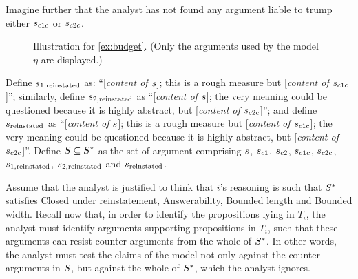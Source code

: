 \documentclass[version=3.21, pagesize, twoside=off, bibliography=totoc, DIV=calc, fontsize=12pt, a4paper]{scrartcl}
\begin{document}
\begin{example}
Imagine further that the analyst has not found any argument liable to trump either $s_{c1c}$ or $s_{c2c}$.

\begin{figure}
	\centering
	\caption{Illustration for \cref{ex:budget}. (Only the arguments used by the model $\eta$ are displayed.)}
	\label{fig:budget}
\end{figure}

Define $s_{1, \text{reinstated}}$ as: “[\emph{content of $s$}]; this is a rough measure but [\emph{content of $s_{c1c}$}]”; similarly, define $s_{2, \text{reinstated}}$ as “[\emph{content of $s$}]; the very meaning could be questioned because it is highly abstract, but [\emph{content of $s_{c2c}$}]”; and define $s_\text{reinstated}$ as “[\emph{content of $s$}]; this is a rough measure but [\emph{content of $s_{c1c}$}]; the very meaning could be questioned because it is highly abstract, but [\emph{content of $s_{c2c}$}]”. Define $S \subseteq S^*$ as the set of argument comprising $s$, $s_{c1}$, $s_{c2}$, $s_{c1c}$, $s_{c2c}$, $s_{1, \text{reinstated}}$, $s_{2, \text{reinstated}}$ and $s_\text{reinstated}$.

Assume that the analyst is justified to think that $i$'s reasoning is such that $S^*$ satisfies Closed under reinstatement, Answerability, Bounded length and Bounded width. Recall now that, in order to identify the propositions lying in $T_i$, the analyst must identify arguments supporting propositions in $T_i$, such that these arguments can resist counter-arguments from the whole of $S^*$. In other words, the analyst must test the claims of the model not only against the counter-arguments in $S$, but against the whole of $S^*$, which the analyst ignores.


\end{example}
\end{document}
